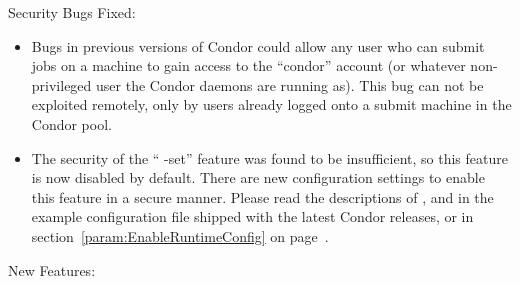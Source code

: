 \noindent Security Bugs Fixed:

\begin{itemize}

\item Bugs in previous versions of Condor could allow any user who can
submit jobs on a machine to gain access to the ``condor'' account
(or whatever non-privileged user the Condor daemons are running as).
This bug can not be exploited remotely, only by users already logged
onto a submit machine in the Condor pool.

\item The security of the `` -set'' feature was
found to be insufficient, so this feature is now disabled by default.
There are new configuration settings to enable this feature in a
secure manner.
Please read the descriptions of ,
 and 
in the example configuration file shipped with the latest Condor
releases, or in section~\ref{param:EnableRuntimeConfig} on
page~\pageref{param:EnableRuntimeConfig}. 

\end{itemize}

\noindent New Features:

